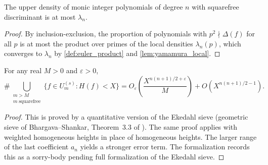 \begin{lemma}
  \label{lem:local_global_upper}
  The upper density of monic integer polynomials of degree \(n\) with
  squarefree discriminant is at most \(\lambda_n\).
\end{lemma}
\begin{proof}
  By inclusion-exclusion, the proportion of polynomials with
  \(p^2\nmid\Delta(f)\) for all \(p\) is at most the product over
  primes of the local densities \(\lambda_n(p)\), which converges to
  \(\lambda_n\) by \cref{def:euler_product} and \cref{lem:yamamura_local}.
\end{proof}


\begin{theorem}
  \label{thm:tail_strong}
  For any real \(M>0\) and \(\varepsilon>0\),
  \[
    \#\bigcup_{\substack{m>M\\m\;\text{squarefree}}}
    \bigl\{f\in U_m^{(s)} : H(f)<X\bigr\}
    = O_\varepsilon\!\left(\frac{X^{n(n+1)/2+\varepsilon}}{M}\right)
    + O\!\left(X^{n(n+1)/2-1}\right).
  \]
\end{theorem}
\begin{proof}
  This is proved by a quantitative version of the Ekedahl sieve
  (geometric sieve of Bhargava--Shankar, Theorem~3.3 of
  \cite{geosieve}).  The same proof applies with weighted homogeneous
  heights in place of homogeneous heights.  The larger range of the
  last coefficient \(a_n\) yields a stronger error term.
  The formalization records this as a sorry-body pending full
  formalization of the Ekedahl sieve.
\end{proof}

